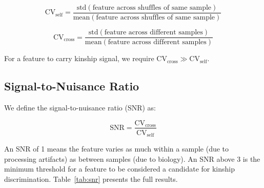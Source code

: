 \documentclass{../yalumba}
\begin{document}
\begin{equation}
  \text{CV}_{\text{self}} = \frac{\text{std}(\text{feature across shuffles of same sample})}
    {\text{mean}(\text{feature across shuffles of same sample})}
\end{equation}

\begin{equation}
  \text{CV}_{\text{cross}} = \frac{\text{std}(\text{feature across different samples})}
    {\text{mean}(\text{feature across different samples})}
\end{equation}

For a feature to carry kinship signal, we require $\text{CV}_{\text{cross}} \gg
\text{CV}_{\text{self}}$.

\subsection{Signal-to-Nuisance Ratio}
\label{sec:snr}

We define the signal-to-nuisance ratio (SNR) as:

\begin{equation}
  \text{SNR} = \frac{\text{CV}_{\text{cross}}}{\text{CV}_{\text{self}}}
  \label{eq:snr}
\end{equation}

An SNR of 1 means the feature varies as much within a sample (due to processing
artifacts) as between samples (due to biology). An SNR above 3 is the minimum
threshold for a feature to be considered a candidate for kinship discrimination.
Table~\ref{tab:snr} presents the full results.
\end{document}
